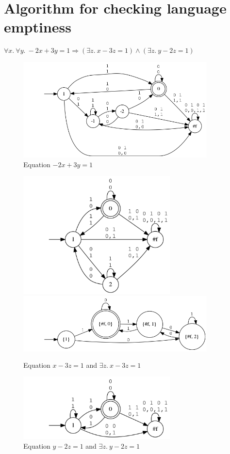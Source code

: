 \section{Algorithm for checking language emptiness}

\begin{example}
  \( \forall x.\ \forall y.\ -2 x + 3y = 1 \Rightarrow (\exists z.\ x -3z = 1) \wedge (\exists z.\ y -2z = 1) \)
  \begin{figure}
    \caption{Equation \( -2 x + 3y = 1 \)}
    \includegraphics[width=10cm]{images/eq5.png}
  \end{figure}
  \begin{figure}
    \caption{Equation \( x -3z = 1 \) and \( \exists z.\ x -3z = 1 \)}
    \includegraphics[width=8cm]{images/mod3is1_x.png}
    \includegraphics[width=10cm]{images/proj_mod3is1_x.png}
  \end{figure}
  \begin{figure}
    \caption{Equation \( y -2z = 1 \) and \( \exists z.\ y -2z = 1 \)}
    \includegraphics[width=8cm]{images/odd_x.png}

\end{figure}
\end{example}
